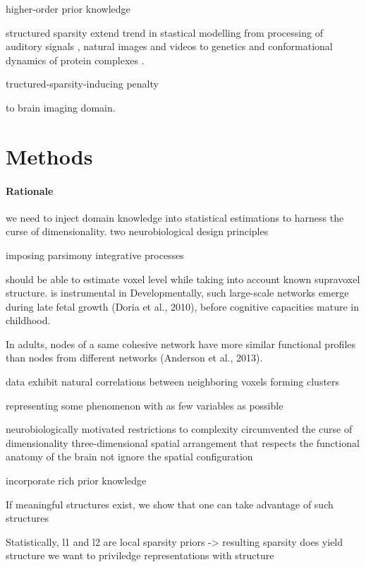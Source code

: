 \documentclass{article} %
\begin{document}
higher-order prior knowledge

structured sparsity
extend trend in stastical modelling from
processing of auditory signals \cite{daudet2004sparse},
natural images \cite{harzallah2009combining} and
videos \cite{kang2015structured, kim2010sparse}
to
genetics \cite{rapaport2008classification, kim2012tree}
and
conformational dynamics of protein complexes \cite{jenatton2009structured}.


tructured-sparsity-inducing penalty


to brain imaging domain.


\section{Methods}
%
\paragraph{Rationale}

we need to inject domain knowledge into
statistical estimations to harness the curse of dimensionality.
two neurobiological design principles

imposing parsimony
integrative processes


should be able to estimate voxel level
while taking into account known supravoxel structure.
is instrumental in
Developmentally, such large-scale networks emerge during late
fetal growth (Doria et al., 2010), before cognitive capacities mature
in childhood. 

In adults, nodes of a same cohesive network have more
similar functional profiles than nodes from different networks
(Anderson et al., 2013).

data exhibit natural correlations between neighboring voxels forming clusters

representing some phenomenon with as few variables as possible

neurobiologically motivated restrictions to complexity circumvented
the curse of dimensionality
three-dimensional spatial arrangement that respects
the functional anatomy of the brain
not ignore the spatial configuration

incorporate rich prior knowledge

If meaningful structures exist,
we show that one can take advantage of such structures

Statistically,
l1 and l2 are local sparsity priors
-> resulting sparsity does yield structure
we want to priviledge representations with structure
\end{document}
